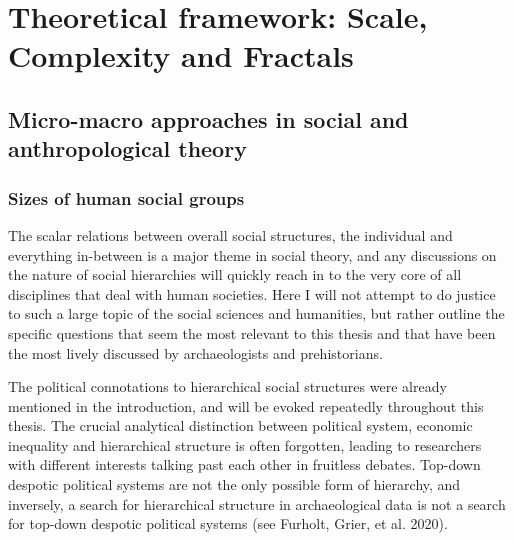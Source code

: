 \documentclass[
  12pt,
  a4paper, twoside]{book}
\begin{document}
\hypertarget{theory}{%
\chapter{Theoretical framework: Scale, Complexity and Fractals}\label{theory}}

\hypertarget{social-hierarchy}{%
\section{Micro-macro approaches in social and anthropological theory}\label{social-hierarchy}}

\hypertarget{sizes-of-human-social-groups}{%
\subsection{Sizes of human social groups}\label{sizes-of-human-social-groups}}

The scalar relations between overall social structures, the individual and everything in-between is a major theme in social theory, and any discussions on the nature of social hierarchies will quickly reach in to the very core of all disciplines that deal with human societies. Here I will not attempt to do justice to such a large topic of the social sciences and humanities, but rather outline the specific questions that seem the most relevant to this thesis and that have been the most lively discussed by archaeologists and prehistorians.

The political connotations to hierarchical social structures were already mentioned in the introduction, and will be evoked repeatedly throughout this thesis. The crucial analytical distinction between political system, economic inequality and hierarchical structure is often forgotten, leading to researchers with different interests talking past each other in fruitless debates. Top-down despotic political systems are not the only possible form of hierarchy, and inversely, a search for hierarchical structure in archaeological data is not a search for top-down despotic political systems (see Furholt, Grier, et al. 2020).
\end{document}
